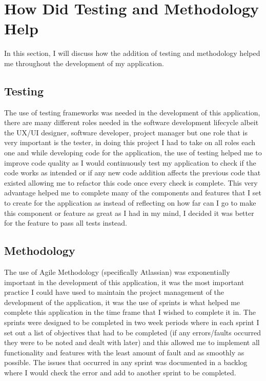 \section{How Did Testing and Methodology Help}

In this section, I will discuss how the addition of testing and methodology helped me throughout the development of my application.

\subsection{Testing}

The use of testing frameworks was needed in the development of this application, there are many different roles needed in the software development lifecycle albeit the UX/UI designer, software developer, project manager but one role that is very important is the tester, in doing this project I had to take on all roles each one and while developing code for the application, the use of testing helped me to improve code quality as I would continuously test my application to check if the code works as intended or if any new code addition affects the previous code that existed allowing me to refactor this code once every check is complete. This very advantage helped me to complete many of the components and features that I set to create for the application as instead of reflecting on how far can I go to make this component or feature as great as I had in my mind, I decided it was better for the feature to pass all tests instead.

\subsection{Methodology}

The use of Agile Methodology (specifically Atlassian) was exponentially important in the development of this application, it was the most important practice I could have used to maintain the project management of the development of the application, it was the use of sprints is what helped me complete this application in the time frame that I wished to complete it in. The sprints were designed to be completed in two week periods where in each sprint I set out a list of objectives that had to be completed (if any errors/faults occurred they were to be noted and dealt with later) and this allowed me to implement all functionality and features with the least amount of fault and as smoothly as possible. The issues that occurred in any sprint was documented in a backlog where I would check the error and add to another sprint to be completed.

